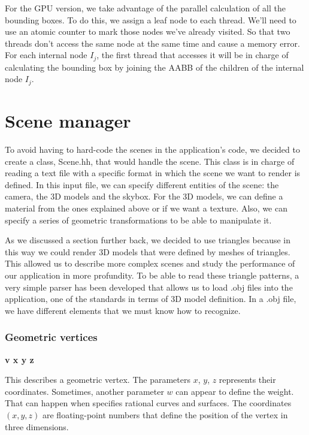 \documentclass[titlepage,12pt]{report}
\begin{document}
For the GPU version, we take advantage of the parallel calculation of all the bounding boxes. To do this, we assign a leaf node to each thread. We'll need to use an atomic counter to mark those nodes we've already visited. So that two threads don't access the same node at the same time and cause a memory error. For each internal node $I_j$, the first thread that accesses it will be in charge of calculating the bounding box by joining the AABB of the children of the internal node $I_j$.

\section{Scene manager}

To avoid having to hard-code the scenes in the application's code, we decided to create a class, Scene.hh, that would handle the scene. This class is in charge of reading a text file with a specific format in which the scene we want to render is defined. In this input file, we can specify different entities of the scene: the camera, the 3D models and the skybox. For the 3D models, we can define a material from the ones explained above or if we want a texture. Also, we can specify a series of geometric transformations to be able to manipulate it.

As we discussed a section further back, we decided to use triangles because in this way we could render 3D models that were defined by meshes of triangles. This allowed us to describe more complex scenes and study the performance of our application in more profundity. To be able to read these triangle patterns, a very simple parser has been developed that allows us to load .obj files into the application, one of the standards in terms of 3D model definition. In a .obj file, we have different elements that we must know how to recognize.

\subsubsection{Geometric vertices}

\textbf{v x y z}

This describes a geometric vertex. The parameters $x$, $y$, $z$ represents their coordinates. Sometimes, another parameter $w$ can appear to define the weight. That can happen when specifies rational curves and surfaces. The coordinates $(x,y,z)$ are floating-point numbers that define the position of the vertex in three dimensions.
\end{document}
